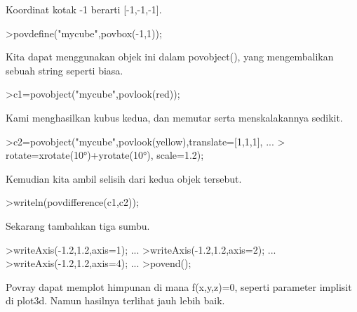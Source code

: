 \documentclass[12pt,arial,letterpaper]{book}
\begin{document}
\begin{eulercomment}
\begin{eulercomment}
\begin{eulercomment}
\begin{eulercomment}
\begin{eulercomment}
\begin{eulercomment}
\begin{eulercomment}
\begin{eulercomment}
\begin{eulercomment}
\begin{eulercomment}
\begin{eulercomment}
\begin{eulercomment}
\begin{eulercomment}
\begin{eulercomment}
\begin{eulercomment}
\begin{eulercomment}
\begin{eulercomment}
\begin{eulercomment}
\begin{eulercomment}
Koordinat kotak -1 berarti [-1,-1,-1].
\end{eulercomment}
\begin{eulerprompt}
>povdefine("mycube",povbox(-1,1));
\end{eulerprompt}
\begin{eulercomment}
Kita dapat menggunakan objek ini dalam povobject(), yang mengembalikan
sebuah string seperti biasa.
\end{eulercomment}
\begin{eulerprompt}
>c1=povobject("mycube",povlook(red));
\end{eulerprompt}
\begin{eulercomment}
Kami menghasilkan kubus kedua, dan memutar serta menskalakannya
sedikit.
\end{eulercomment}
\begin{eulerprompt}
>c2=povobject("mycube",povlook(yellow),translate=[1,1,1], ...
>  rotate=xrotate(10°)+yrotate(10°), scale=1.2);
\end{eulerprompt}
\begin{eulercomment}
Kemudian kita ambil selisih dari kedua objek tersebut.
\end{eulercomment}
\begin{eulerprompt}
>writeln(povdifference(c1,c2));
\end{eulerprompt}
\begin{eulercomment}
Sekarang tambahkan tiga sumbu.
\end{eulercomment}
\begin{eulerprompt}
>writeAxis(-1.2,1.2,axis=1); ...
>writeAxis(-1.2,1.2,axis=2); ...
>writeAxis(-1.2,1.2,axis=4); ...
>povend();
\end{eulerprompt}
\begin{eulercomment}
Povray dapat memplot himpunan di mana f(x,y,z)=0, seperti parameter
implisit di plot3d. Namun hasilnya terlihat jauh lebih baik.


\end{eulercomment}
\end{eulercomment}
\end{eulercomment}
\end{eulercomment}
\end{eulercomment}
\end{eulercomment}
\end{eulercomment}
\end{eulercomment}
\end{eulercomment}
\end{eulercomment}
\end{eulercomment}
\end{eulercomment}
\end{eulercomment}
\end{eulercomment}
\end{eulercomment}
\end{eulercomment}
\end{eulercomment}
\end{eulercomment}
\end{eulercomment}
\end{document}
